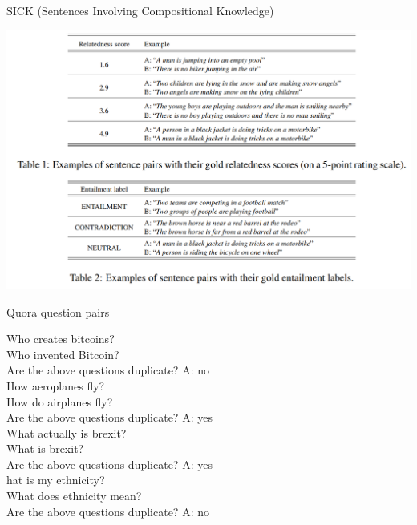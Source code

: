 \documentclass[10pt]{beamer}
\begin{document}
\begin{frame}{SICK (Sentences Involving Compositional Knowledge) \cite{Marelli14}}

\begin{center}
\includegraphics[scale=0.25]{images/sick.png}
\end{center}

\end{frame}

\begin{frame}{Quora question pairs \cite{quora}}


Who creates bitcoins?\\
Who invented Bitcoin?\\
Are the above questions duplicate? \alert{A: no}\\


How aeroplanes fly?\\
How do airplanes fly?\\
Are the above questions duplicate? \alert{A: yes}\\



What actually is brexit?\\
What is brexit?\\
Are the above questions duplicate? \alert{A: yes}\\


hat is my ethnicity?\\
What does ethnicity mean?\\
Are the above questions duplicate? \alert{A: no}\\

\end{frame}
\end{document}

